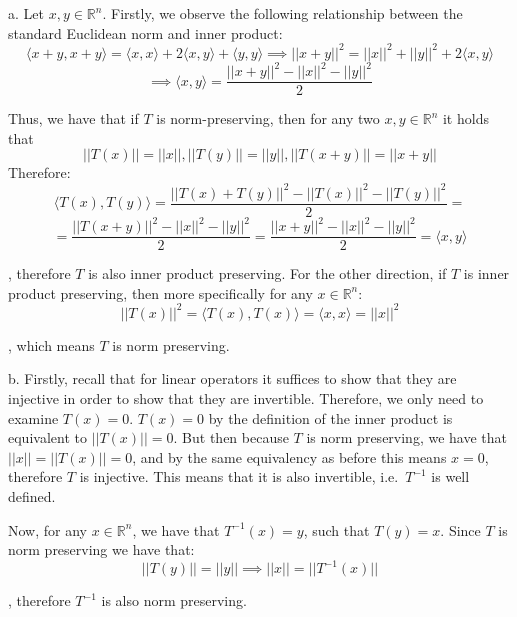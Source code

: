 \begin{solution}

    a. Let $x, y \in \mathbb{R}^n$. Firstly, we observe the following relationship between the standard Euclidean norm and inner product:
    $$\langle x + y, x + y \rangle = \langle x, x \rangle + 2\langle x, y \rangle + \langle y, y \rangle \implies \lvert \lvert x+ y \rvert \rvert^2 = \lvert \lvert x \rvert \rvert^2 + \lvert \lvert y \rvert \rvert^2 + 2\langle x, y \rangle$$
    $$\implies \langle x, y \rangle = \frac{\lvert \lvert x + y \rvert \rvert^2 - \lvert \lvert x \rvert \rvert^2 - \lvert \lvert y \rvert \rvert^2}{2}$$

    Thus, we have that if $T$ is norm-preserving, then for any two $x, y \in \mathbb{R}^n$ it holds that
    $$\lvert \lvert T(x) \rvert \rvert = \lvert \lvert x \rvert \rvert, \lvert \lvert T(y) \rvert \rvert = \lvert \lvert y \rvert \rvert, \lvert \lvert T(x+y) \rvert \rvert = \lvert \lvert x + y\rvert \rvert$$
     Therefore:
    $$\langle T(x), T(y) \rangle  = \frac{\lvert \lvert T(x) + T(y) \rvert \rvert^2 - \lvert \lvert T(x) \rvert \rvert^2 - \lvert \lvert T(y) \rvert \rvert^2}{2} = $$
    $$ = \frac{\lvert \lvert T(x + y) \rvert \rvert^2 - \lvert \lvert x \rvert \rvert^2 - \lvert \lvert y \rvert \rvert^2}{2} = \frac{\lvert \lvert x + y \rvert \rvert^2 - \lvert \lvert x \rvert \rvert^2 - \lvert \lvert y \rvert \rvert^2}{2} = \langle x, y \rangle$$

    , therefore $T$ is also inner product preserving. For the other direction, if $T$ is inner product preserving, then more specifically for any $x \in \mathbb{R}^n$:
    $$\lvert \lvert T(x) \rvert \rvert^2 = \langle T(x), T(x) \rangle = \langle x, x \rangle = \lvert 
    \lvert x \rvert \rvert^2$$

    , which means $T$ is norm preserving.

    b. Firstly, recall that for linear operators it suffices to show that they are injective in order to show that they are invertible. Therefore, we only need to examine $T(x) = 0$. $T(x) = 0$ by the definition of the inner product is equivalent to $\lvert \lvert T(x) \rvert \rvert = 0$. But then because $T$ is norm preserving, we have that $\lvert \lvert x \rvert \rvert = \lvert \lvert T(x) \rvert \rvert = 0$, and by the same equivalency as before this means $x = 0$, therefore $T$ is injective. This means that it is also invertible, i.e.\ $T^{-1}$ is well defined. 

    Now, for any $x \in \mathbb{R}^n$, we have that $T^{-1}(x) = y$, such that $T(y) = x$. Since $T$ is norm preserving we have that:
    $$\lvert \lvert T(y) \rvert \rvert = \lvert \lvert y \rvert \rvert \implies \lvert \lvert x \rvert \rvert = \lvert \lvert T^{-1}(x) \rvert \rvert$$

    , therefore $T^{-1}$ is also norm preserving.
\end{solution}

